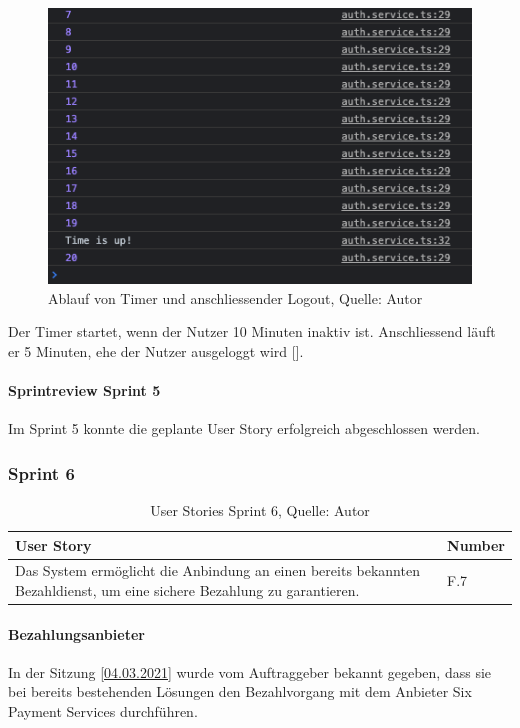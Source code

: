  \begin{figure}[H]
 	\centering
 	\includegraphics[scale=0.4]{images/idle.PNG}
 	\caption[Ablauf von Timer und anschliessender Logout]{Ablauf von Timer und anschliessender Logout, Quelle: Autor}
 	\label{img: autoLogout}
 \end{figure} 
Der Timer startet, wenn der Nutzer 10 Minuten inaktiv ist. Anschliessend läuft er 5 Minuten, ehe der Nutzer ausgeloggt wird [\cite{idle}]. 
 
\paragraph{Sprintreview Sprint 5}
 Im Sprint 5 konnte die geplante User Story erfolgreich abgeschlossen werden.
 
\subsubsection{Sprint 6}
\begin{table}[H]
	\setlength\extrarowheight{2pt} %
	\begin{tabularx}{\textwidth}{|X|l|}
		\hline
		\textbf{User Story} & \textbf{Number} \\
		\hline
		Das System ermöglicht die Anbindung an einen bereits bekannten Bezahldienst, 
		um eine sichere Bezahlung zu garantieren.& F.7\\
		\hline
	\end{tabularx} 
	\caption[User Stories Sprint 6]{User Stories Sprint 6, Quelle: Autor}
\end{table}\label{userStoriesSprint6}
\paragraph{Bezahlungsanbieter}
In der Sitzung \ref{04.03.2021} wurde vom Auftraggeber bekannt gegeben, dass sie bei bereits bestehenden Lösungen den Bezahlvorgang mit dem Anbieter Six Payment Services durchführen. 

